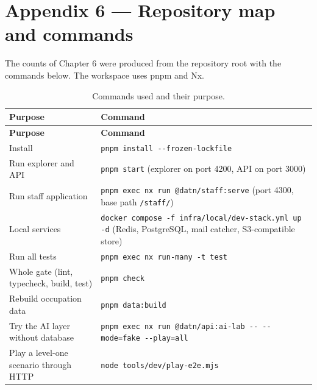 \newpage
\section*{Appendix 6 --- Repository map and commands}

The counts of Chapter 6 were produced from the repository root with the commands below. The workspace uses pnpm and Nx.

{\small{}\renewcommand{\arraystretch}{1.1}
\begin{longtable}{|>{\raggedright\arraybackslash}p{}|>{\raggedright\arraybackslash}p{}|}
\caption{Commands used and their purpose.} \\
\hline
\textbf{Purpose} & \textbf{Command} \\ \hline
\endfirsthead
\hline
\textbf{Purpose} & \textbf{Command} \\ \hline
\endhead
Install & \texttt{pnpm install -\allowbreak{}-\allowbreak{}frozen-\allowbreak{}lockfile} \\ \hline
Run explorer and API & \texttt{pnpm start} (explorer on port 4200, API on port 3000) \\ \hline
Run staff application & \texttt{pnpm exec nx run @\allowbreak{}datn/\allowbreak{}staff:serve} (port 4300, base path \texttt{/\allowbreak{}staff/\allowbreak{}}) \\ \hline
Local services & \texttt{docker compose -\allowbreak{}f infra/\allowbreak{}local/\allowbreak{}dev-\allowbreak{}stack.\allowbreak{}yml up -\allowbreak{}d} (Redis, PostgreSQL, mail catcher, S3-\allowbreak{}compatible store) \\ \hline
Run all tests & \texttt{pnpm exec nx run-\allowbreak{}many -\allowbreak{}t test} \\ \hline
Whole gate (lint, typecheck, build, test) & \texttt{pnpm check} \\ \hline
Rebuild occupation data & \texttt{pnpm data:build} \\ \hline
Try the AI layer without database & \texttt{pnpm exec nx run @\allowbreak{}datn/\allowbreak{}api:ai-\allowbreak{}lab -\allowbreak{}-\allowbreak{} -\allowbreak{}-\allowbreak{}mode=fake -\allowbreak{}-\allowbreak{}play=all} \\ \hline
Play a level-one scenario through HTTP & \texttt{node tools/\allowbreak{}dev/\allowbreak{}play-\allowbreak{}e2e.\allowbreak{}mjs} \\ \hline
\end{longtable}
}

